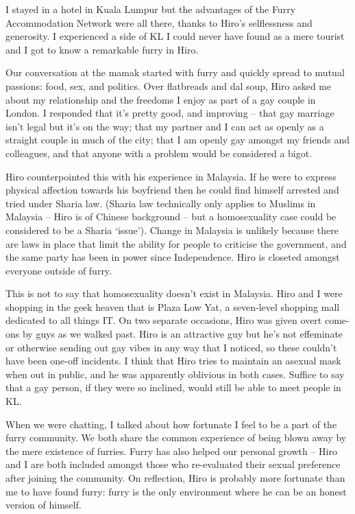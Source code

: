 I stayed in a hotel in Kuala Lumpur but the advantages of the Furry Accommodation Network were all there, thanks to Hiro's selflessness and generosity. I experienced a side of KL I could never have found as a mere tourist and I got to know a remarkable furry in Hiro.

Our conversation at the mamak started with furry and quickly spread to mutual passions: food, sex, and politics. Over flatbreads and dal soup, Hiro asked me about my relationship and the freedoms I enjoy as part of a gay couple in London. I responded that it's pretty good, and improving -- that gay marriage isn't legal but it's on the way; that my partner and I can act as openly as a straight couple in much of the city; that I am openly gay amongst my friends and colleagues, and that anyone with a problem would be considered a bigot.

Hiro counterpointed this with his experience in Malaysia. If he were to express physical affection towards his boyfriend then he could find himself arrested and tried under Sharia law. (Sharia law technically only applies to Muslims in Malaysia -- Hiro is of Chinese background -- but a homosexuality case could be considered to be a Sharia `issue'). Change in Malaysia is unlikely because there are laws in place that limit the ability for people to criticise the government, and the same party has been in power since Independence. Hiro is closeted amongst everyone outside of furry.

This is not to say that homosexuality doesn't exist in Malaysia. Hiro and I were shopping in the geek heaven that is Plaza Low Yat, a seven-level shopping mall dedicated to all things IT. On two separate occasions, Hiro was given overt come-ons by guys as we walked past. Hiro is an attractive guy but he's not effeminate or otherwise sending out gay vibes in any way that I noticed, so these couldn't have been one-off incidents. I think that Hiro tries to maintain an asexual mask when out in public, and he was apparently oblivious in both cases. Suffice to say that a gay person, if they were so inclined, would still be able to meet people in KL.

When we were chatting, I talked about how fortunate I feel to be a part of the furry community. We both share the common experience of being blown away by the mere existence of furries. Furry has also helped our personal growth -- Hiro and I are both included amongst those who re-evaluated their sexual preference after joining the community. On reflection, Hiro is probably more fortunate than me to have found furry: furry is the only environment where he can be an honest version of himself.

